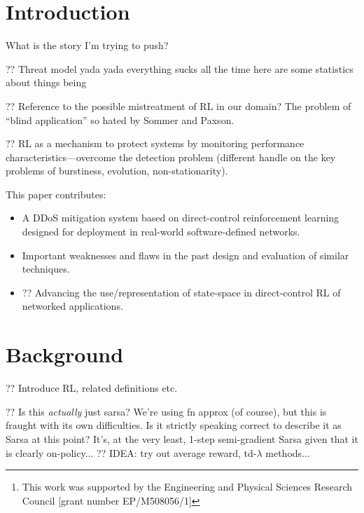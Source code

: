 \documentclass[conference, letterpaper, 10pt, times]{IEEEtran}
\title{\mytitle{}}
\author{Kyle A. Simpson\thanks{This work was supported by the Engineering and Physical Sciences
		Research Council [grant number EP/M508056/1]}\\\emph{University of Glasgow, Glasgow, Scotland},\\
		\email{k.simpson.1@research.gla.ac.uk}}
\date{}
\begin{document}

\maketitle

\begin{abstract}
	Make it look convincing!
\end{abstract}

\section{Introduction}

What is the story I'm trying to push?

?? Threat model yada yada everything sucks all the time here are some statistics about things being 

?? Reference to the possible mistreatment of RL in our domain? The problem of ``blind application'' so hated by Sommer and Paxson.

?? RL as a mechanism to protect systems by monitoring performance characteristics---overcome the detection problem (different handle on the key problems of burstiness, evolution, non-stationarity).

This paper contributes:
\begin{itemize}
	\item A DDoS mitigation system based on direct-control reinforcement learning designed for deployment in real-world software-defined networks.
	\item Important weaknesses and flaws in the past design and evaluation of similar techniques.
	\item ?? Advancing the use/representation of state-space in direct-control RL of networked applications.
\end{itemize}

\section{Background}

?? Introduce RL, related definitions etc.

?? Is this \emph{actually} just sarsa? We're using fn approx (of course), but this is fraught with its own difficulties. Is it strictly speaking correct to describe it as Sarsa at this point? It's, at the very least, 1-step semi-gradient Sarsa given that it is clearly on-policy...
?? IDEA: try out average reward, td-$\lambda$ methods...
\end{document}
